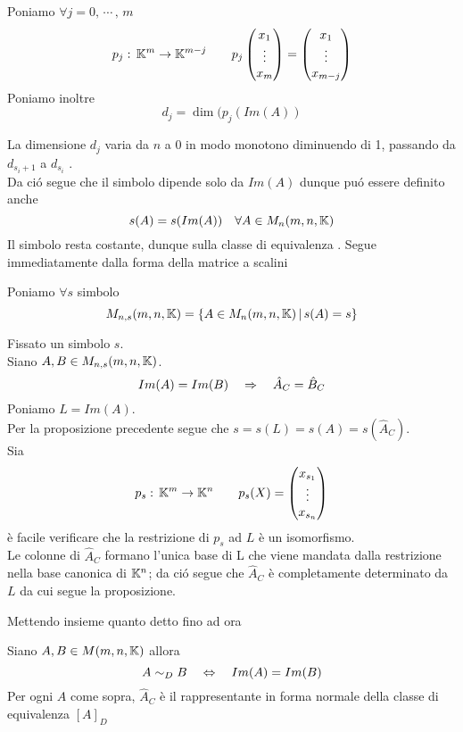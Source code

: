  Poniamo $\forall j=0,\, \cdots \, , \, m $
 $$ p_j:\, \mathbb{K}^m \to \mathbb{K}^{m-j} \qquad  p_j \begin{pmatrix}
 x_1 \\ \vdots \\ x_m
 \end{pmatrix} = \begin{pmatrix}
 x_1 \\ \vdots \\ x_{m-j} 
 \end{pmatrix}$$
 Poniamo inoltre
 $$ d_j=\dim(p_j(Im(A))$$
 \begin{prop} La dimensione $d_j$ varia da $n$ a $0$ in modo monotono diminuendo di 1, passando da $d_{s_i+1} $ a $d_{s_i}$ .\\
 Da ci\'o segue che il simbolo dipende solo da $Im(A)$ dunque pu\'o essere definito anche 
 $$s(A)=s(Im(A)) \quad \forall A \in M_n(m,n,\mathbb{K}) $$
 Il simbolo resta costante, dunque sulla classe di equivalenza .
\proof Segue immediatamente dalla forma della matrice a scalini
 \end{prop}
 \spazio
 Poniamo $\forall s $ simbolo 
 $$M_{n,s}(m,n,\mathbb{K}) = \{ A \in M_n(m,n,\mathbb{K}) \, \vert \, s(A)=s \} $$ 
 \begin{prop} Fissato un simbolo $s$.\\
 Siano $A,B \in M_{n,s}(m,n,\mathbb{K}) $.
 $$ Im(A)=Im(B) \quad \Rightarrow \quad \hat{A}_C= \hat{B}_C $$
 \proof
 Poniamo $L=Im(A)$.\\ 
 Per la proposizione precedente segue che $s=s(L)=s(A)=s(\hat{A}_C)$.\\
 Sia 
 $$ p_s :\, \mathbb{K} ^m \to \mathbb{K}^n \qquad p_s(X)= \begin{pmatrix}
 x_{s_1} \\ \vdots \\ x_{s_n} 
 \end{pmatrix}$$ 
 \`e facile verificare che la restrizione di $p_s$ ad $L$ \`e un isomorfismo.\\
 Le colonne di $\hat{A}_C$ formano l'unica base di L che viene mandata dalla restrizione nella base canonica di $\mathbb{K}^n $; da ci\'o segue che $\hat{A}_C $ \`e completamente determinato da $L $ da cui segue la proposizione.
 \endproof
 \end{prop}
 \spazio
Mettendo insieme quanto detto fino ad ora
\begin{cor}\bianco
Siano $A,B \in M(m,n,\mathbb{K}) $ allora
$$ A \sim_D B \quad \Leftrightarrow \quad Im(A)=Im(B)$$
Per ogni $A$ come sopra, $\hat{A}_C$ \`e il rappresentante in forma normale della classe di equivalenza $[A]_D$
\end{cor}

